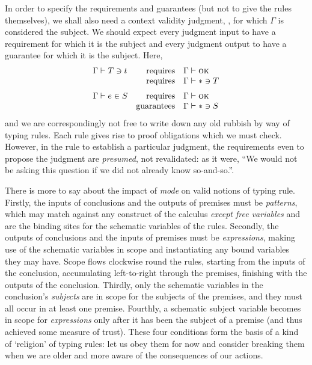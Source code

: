 \documentclass[natbib]{article}
\newcommand{\type}{\ast}
\newcommand{\VALID}[1]{#1 \vdash \textsc{ok}}
\begin{document}
In order to specify the requirements and guarantees (but not to give the rules themselves), we shall also
need a context validity judgment, \framebox{$\VALID\Gamma$}, for which $\Gamma$ is considered the subject.
We should expect every judgment input to have a requirement for which it is the subject and every judgment output to have a guarantee for which it is the subject. Here,
\[\begin{array}{lrl}
\CHK\Gamma Tt & \mbox{requires} & \VALID\Gamma \\
              & \mbox{requires} & \CHK\Gamma \type T \medskip \\
\SYN\Gamma eS & \mbox{requires} & \VALID\Gamma \\
              & \mbox{guarantees} & \CHK\Gamma \type S
\end{array}\]
and we are correspondingly not free to write down any old rubbish by way of typing rules. Each rule gives
rise to proof obligations which we must check. However, in the rule to establish a particular judgment,
the requirements even to propose the judgment are \emph{presumed}, not revalidated: as it were, ``We would not be asking this question if we did not already know so-and-so.''.

There is more to say about the impact of \emph{mode} on valid notions of typing rule. Firstly, the inputs of conclusions and the outputs of premises must be \emph{patterns}, which may match against any construct of the calculus \emph{except free variables} and are the binding sites for the schematic variables of the rules.  Secondly, the outputs of conclusions and the inputs of premises must be \emph{expressions}, making use of the schematic variables in scope and instantiating any bound variables they may have. Scope flows clockwise round the rules, starting from the inputs of the conclusion, accumulating left-to-right through the premises, finishing with the outputs of the conclusion. Thirdly, only the schematic variables in the conclusion's \emph{subjects} are
in scope for the subjects of the premises, and they must all occur in at least one premise. Fourthly, a schematic subject variable becomes in scope for \emph{expressions} only after it has been the subject of a premise (and thus achieved some measure of trust). These four conditions form the basis of a kind of `religion' of typing rules: let us obey them for now and consider breaking them when we are older and more aware of the consequences of our actions.
\end{document}
